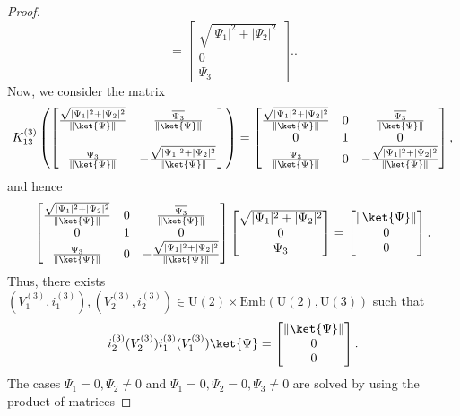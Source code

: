 \documentclass[a4paper,11pt]{article}
\begin{document}
\begin{appendices}
\begin{proof}
$$        = \begin{bmatrix} \sqrt{ |\Psi_1|^2+|\Psi_2|^2}\\ 0\\ \Psi_3\end{bmatrix}.
        .
      $$
      Now, we consider the matrix
      $$
      K_{13}^{(3)}\left( \begin{bmatrix}
        \frac{\sqrt{ |\Psi_1|^2+|\Psi_2|^2}}{\|\ket{\Psi}\|}  & \frac{\overline{\Psi_3}}{\|\ket{\Psi}\|} \\
        & \\
        \frac{\Psi_3}{\|\ket{\Psi}\|} & -\frac{\sqrt{ |\Psi_1|^2+|\Psi_2|^2}}{\|\ket{\Psi}\|}
        \end{bmatrix}\right) = \begin{bmatrix}
          \frac{\sqrt{ |\Psi_1|^2+|\Psi_2|^2}}{\|\ket{\Psi}\|} & 0  &\frac{\overline{\Psi_3}}{\|\ket{\Psi}\|} \\
        0 & 1 & 0 \\
        \frac{\Psi_3}{\|\ket{\Psi}\|} & 0 & -\frac{\sqrt{ |\Psi_1|^2+|\Psi_2|^2}}{\|\ket{\Psi}\|}
        \end{bmatrix},
      $$
      and hence 
      $$
      \begin{bmatrix}
        \frac{\sqrt{ |\Psi_1|^2+|\Psi_2|^2}}{\|\ket{\Psi}\|} & 0  &\frac{\overline{\Psi_3}}{\|\ket{\Psi}\|} \\
      0 & 1 & 0 \\
      \frac{\Psi_3}{\|\ket{\Psi}\|} & 0 & -\frac{\sqrt{ |\Psi_1|^2+|\Psi_2|^2}}{\|\ket{\Psi}\|}
      \end{bmatrix}\begin{bmatrix} \sqrt{ |\Psi_1|^2+|\Psi_2|^2}\\ 0\\ \Psi_3\end{bmatrix} = \begin{bmatrix} \|\ket{\Psi}\|\\ 0\\ 0\end{bmatrix}.
      $$
      Thus, there exists $(V_1^{(3)},i_1^{(3)}),(V_2^{(3)},i_2^{(3)}) \in \mathrm{U}(2) \times\mathrm{Emb}(\mathrm{U}(2),\mathrm{U}(3))$ such that 
      $$
      i_2^{(3)}(V_2^{(3)})i_1^{(3)}(V_1^{(3)})\ket{\Psi} = \begin{bmatrix} \|\ket{\Psi}\|\\ 0\\ 0\end{bmatrix}.
      $$
  The cases $\Psi_1 = 0,\Psi_2\neq 0$ and $\Psi_1 = 0,\Psi_2 =0,\Psi_3\neq 0$ are solved by using the product of matrices

\end{proof}
\end{appendices}
\end{document}
